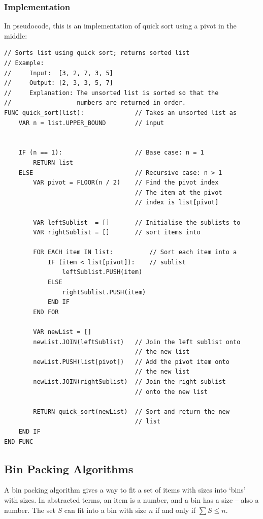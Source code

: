         \subsubsection{Implementation}
        In pseudocode, this is an implementation of quick sort using a pivot in the middle:
        \begin{verbatim}
// Sorts list using quick sort; returns sorted list
// Example:
//     Input:  [3, 2, 7, 3, 5]
//     Output: [2, 3, 3, 5, 7]
//     Explanation: The unsorted list is sorted so that the
//                  numbers are returned in order.
FUNC quick_sort(list):              // Takes an unsorted list as
    VAR n = list.UPPER_BOUND        // input

    
    IF (n == 1):                    // Base case: n = 1
        RETURN list
    ELSE                            // Recursive case: n > 1
        VAR pivot = FLOOR(n / 2)    // Find the pivot index
                                    // The item at the pivot
                                    // index is list[pivot]

        VAR leftSublist  = []       // Initialise the sublists to
        VAR rightSublist = []       // sort items into

        FOR EACH item IN list:          // Sort each item into a
            IF (item < list[pivot]):    // sublist
                leftSublist.PUSH(item)
            ELSE
                rightSublist.PUSH(item)
            END IF
        END FOR

        VAR newList = []
        newList.JOIN(leftSublist)   // Join the left sublist onto
                                    // the new list
        newList.PUSH(list[pivot])   // Add the pivot item onto
                                    // the new list
        newList.JOIN(rightSublist)  // Join the right sublist
                                    // onto the new list

        RETURN quick_sort(newList)  // Sort and return the new
                                    // list
    END IF
END FUNC
        \end{verbatim}
    \newpage

    \subsection{Bin Packing Algorithms}
        A bin packing algorithm gives a way to fit a set of items with sizes into `bins' with sizes.
        In abstracted terms, an item is a number, and a bin has a size -- also a number.
        The set $S$ can fit into a bin with size $n$ if and only if $\sum S\le n$.

